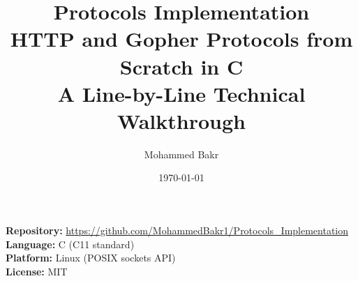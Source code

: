 \documentclass[11pt,a4paper]{report}
\title{
    \vspace{-2cm}
    {\Huge \textbf{Protocols Implementation}}\\[0.5em]
    {\Large HTTP and Gopher Protocols from Scratch in C}\\[1em]
    {\large A Line-by-Line Technical Walkthrough}
}
\author{Mohammed Bakr}
\date{\today}
\begin{document}
\maketitle
\thispagestyle{empty}

\begin{center}
\vspace{2cm}
\begin{tcolorbox}[colback=notebg, colframe=titleblue!60, width=0.8\textwidth, boxrule=0.5pt]
\textbf{Repository:} \url{https://github.com/MohammedBakr1/Protocols_Implementation}\\
\textbf{Language:} C (C11 standard)\\
\textbf{Platform:} Linux (POSIX sockets API)\\
\textbf{License:} MIT
\end{tcolorbox}
\end{center}

\newpage
\thispagestyle{empty}
\tableofcontents

\newpage















\end{document}
